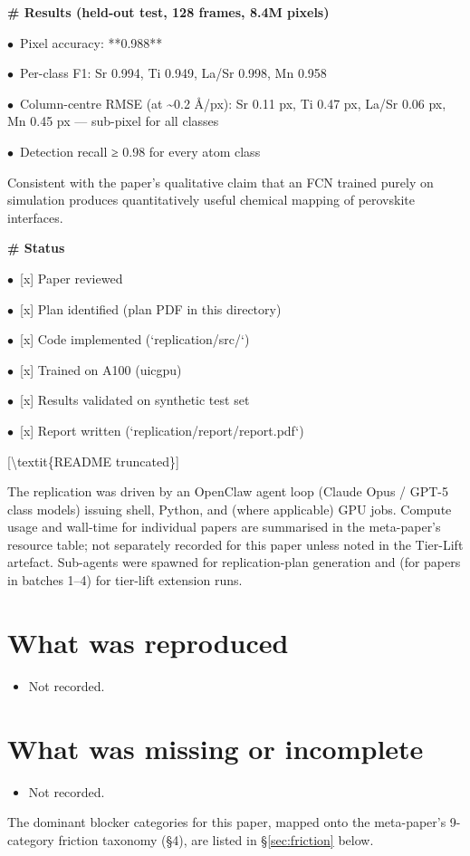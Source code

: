 \documentclass[11pt]{article}
\begin{document}
\par\medskip\textbf{\# Results (held-out test, 128 frames, 8.4M pixels)}\par
\par$\bullet$\ Pixel accuracy: **0.988**
\par$\bullet$\ Per-class F1: Sr 0.994, Ti 0.949, La/Sr 0.998, Mn 0.958
\par$\bullet$\ Column-centre RMSE (at \textasciitilde{}0.2 Å/px): Sr 0.11 px, Ti 0.47 px, La/Sr 0.06 px, Mn 0.45 px — sub-pixel for all classes
\par$\bullet$\ Detection recall ≥ 0.98 for every atom class

Consistent with the paper's qualitative claim that an FCN trained purely on simulation produces quantitatively useful chemical mapping of perovskite interfaces.

\par\medskip\textbf{\# Status}\par
\par$\bullet$\ [x] Paper reviewed
\par$\bullet$\ [x] Plan identified (plan PDF in this directory)
\par$\bullet$\ [x] Code implemented (`replication/src/`)
\par$\bullet$\ [x] Trained on A100 (uicgpu)
\par$\bullet$\ [x] Results validated on synthetic test set
\par$\bullet$\ [x] Report written (`replication/report/report.pdf`)

[\textbackslash{}textit\{README truncated\}]
\normalsize

The replication was driven by an OpenClaw agent loop (Claude Opus / GPT-5 class models) issuing shell, Python, and (where applicable) GPU jobs. Compute usage and wall-time for individual papers are summarised in the meta-paper's resource table; not separately recorded for this paper unless noted in the Tier-Lift artefact. Sub-agents were spawned for replication-plan generation and (for papers in batches 1--4) for tier-lift extension runs.

\section{What was reproduced}
\begin{itemize}
\item Not recorded.
\end{itemize}

\section{What was missing or incomplete}
\begin{itemize}
\item Not recorded.
\end{itemize}
The dominant blocker categories for this paper, mapped onto the meta-paper's 9-category friction taxonomy (\S4), are listed in \S\ref{sec:friction} below.
\end{document}
